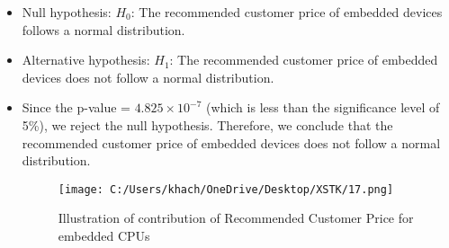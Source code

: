 \documentclass[a4paper]{article}
\begin{document}
\begin{enumerate}
		\begin{itemize}
		\item Null hypothesis:
			\( H_0 \): The recommended customer price of embedded devices follows a normal distribution.
		\item Alternative hypothesis:
			\( H_1 \): The recommended customer price of embedded devices does not follow a normal distribution.
			\item Since the p-value = \(4.825 \times 10^{-7}\) (which is less than the significance level of 5\%), we reject the null hypothesis. Therefore, we conclude that the recommended customer price of embedded devices does not follow a normal distribution.
			\begin{figure}[htbp]
				\centering
				\begin{adjustbox}{width=0.7\textwidth, frame}
					\texttt{[image: C:/Users/khach/OneDrive/Desktop/XSTK/17.png]}
				\end{adjustbox}
				\captionsetup{justification=centering}
				\vspace{0.5cm}
				\caption{Illustration of contribution of Recommended Customer Price for embedded CPUs}
			\end{figure}
		\end{itemize}
	\end{enumerate}
	\newpage
\end{document}
